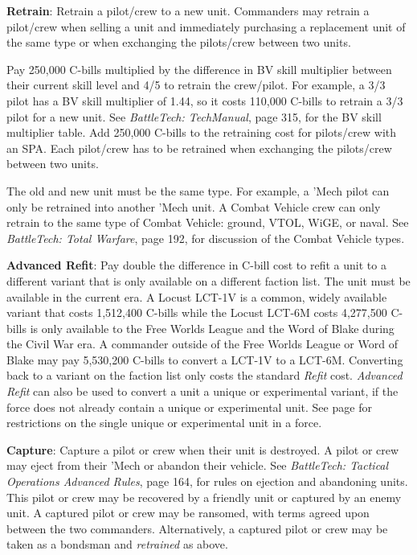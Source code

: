 \item {\bfseries Retrain}: Retrain a pilot/crew to a new unit.
Commanders may retrain a pilot/crew when selling a unit and immediately purchasing a replacement unit of the same type or when exchanging the pilots/crew between two units.

Pay 250,000 C-bills multiplied by the difference in BV skill multiplier between their current skill level and 4/5 to retrain the crew/pilot.
For example, a 3/3 pilot has a BV skill multiplier of 1.44, so it costs 110,000 C-bills to retrain a 3/3 pilot for a new unit.
See \emph{BattleTech: TechManual}, page 315, for the BV skill multiplier table.
Add 250,000 C-bills to the retraining cost for pilots/crew with an SPA.
Each pilot/crew has to be retrained when exchanging the pilots/crew between two units.

The old and new unit must be the same type.
For example, a 'Mech pilot can only be retrained into another 'Mech unit.
A Combat Vehicle crew can only retrain to the same type of Combat Vehicle: ground, VTOL, WiGE, or naval.
See \emph{BattleTech: Total Warfare}, page 192, for discussion of the Combat Vehicle types.

\item {\bfseries Advanced Refit}: Pay double the difference in C-bill cost to refit a unit to a different variant that is only available on a different faction list.
The unit must be available in the current era.
A Locust LCT-1V is a common, widely available variant that costs 1,512,400 C-bills while the Locust LCT-6M costs 4,277,500 C-bills is only available to the Free Worlds League and the Word of Blake during the Civil War era.
A commander outside of the Free Worlds League or Word of Blake may pay 5,530,200 C-bills to convert a LCT-1V to a LCT-6M.
Converting back to a variant on the faction list only costs the standard \emph{Refit} cost.
\emph{Advanced Refit} can also be used to convert a unit a unique or experimental variant, if the force does not already contain a unique or experimental unit.
See page \pageref{subsec:force_construction} for restrictions on the single unique or experimental unit in a force.

\item {\bfseries Capture}: Capture a pilot or crew when their unit is destroyed.
A pilot or crew may eject from their 'Mech or abandon their vehicle.
See \emph{BattleTech: Tactical Operations Advanced Rules}, page 164, for rules on ejection and abandoning units.
This pilot or crew may be recovered by a friendly unit or captured by an enemy unit.
A captured pilot or crew may be ransomed, with terms agreed upon between the two commanders.
Alternatively, a captured pilot or crew may be taken as a bondsman and \emph{retrained} as above.

